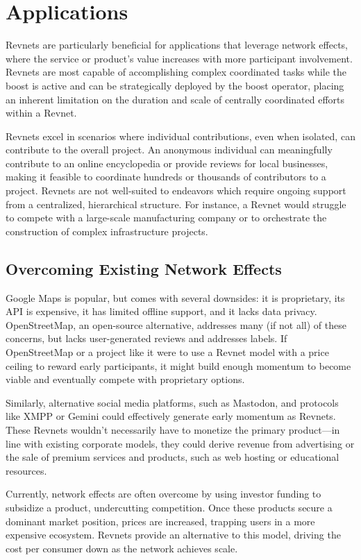 \documentclass{article}
\begin{document}
\section{Applications}

Revnets are particularly beneficial for applications that leverage network effects, where the service or product's value increases with more participant involvement. Revnets are most capable of accomplishing complex coordinated tasks while the boost is active and can be strategically deployed by the boost operator, placing an inherent limitation on the duration and scale of centrally coordinated efforts within a Revnet.

Revnets excel in scenarios where individual contributions, even when isolated, can contribute to the overall project. An anonymous individual can meaningfully contribute to an online encyclopedia or provide reviews for local businesses, making it feasible to coordinate hundreds or thousands of contributors to a project. Revnets are not well-suited to endeavors which require ongoing support from a centralized, hierarchical structure. For instance, a Revnet would struggle to compete with a large-scale manufacturing company or to orchestrate the construction of complex infrastructure projects.

\subsection{Overcoming Existing Network Effects}

Google Maps is popular, but comes with several downsides: it is proprietary, its API is expensive, it has limited offline support, and it lacks data privacy. OpenStreetMap, an open-source alternative, addresses many (if not all) of these concerns, but lacks user-generated reviews and addresses labels. If OpenStreetMap or a project like it were to use a Revnet model with a price ceiling to reward early participants, it might build enough momentum to become viable and eventually compete with proprietary options.

Similarly, alternative social media platforms, such as Mastodon, and protocols like XMPP or Gemini could effectively generate early momentum as Revnets. These Revnets wouldn't necessarily have to monetize the primary product---in line with existing corporate models, they could derive revenue from advertising or the sale of premium services and products, such as web hosting or educational resources. 

Currently, network effects are often overcome by using investor funding to subsidize a product, undercutting competition. Once these products secure a dominant market position, prices are increased, trapping users in a more expensive ecosystem. Revnets provide an alternative to this model, driving the cost per consumer down as the network achieves scale.
\end{document}
